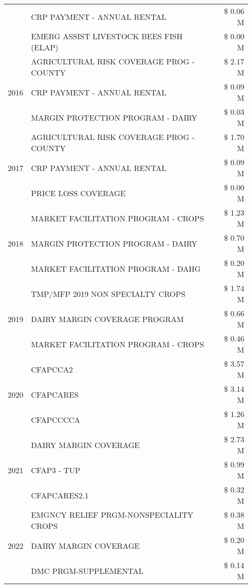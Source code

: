 \begin{tabular}{llr}
 & CRP PAYMENT - ANNUAL RENTAL & \$ 0.06 M \\
 & EMERG ASSIST LIVESTOCK BEES FISH (ELAP) & \$ 0.00 M \\
\cline{1-3}
\multirow[t]{3}{*}{2016} & AGRICULTURAL RISK COVERAGE PROG - COUNTY & \$ 2.17 M \\
 & CRP PAYMENT - ANNUAL RENTAL & \$ 0.09 M \\
 & MARGIN PROTECTION PROGRAM - DAIRY & \$ 0.03 M \\
\cline{1-3}
\multirow[t]{3}{*}{2017} & AGRICULTURAL RISK COVERAGE PROG - COUNTY & \$ 1.70 M \\
 & CRP PAYMENT - ANNUAL RENTAL & \$ 0.09 M \\
 & PRICE LOSS COVERAGE & \$ 0.00 M \\
\cline{1-3}
\multirow[t]{3}{*}{2018} & MARKET FACILITATION PROGRAM - CROPS & \$ 1.23 M \\
 & MARGIN PROTECTION PROGRAM - DAIRY & \$ 0.70 M \\
 & MARKET FACILITATION PROGRAM - DAHG & \$ 0.20 M \\
\cline{1-3}
\multirow[t]{3}{*}{2019} & TMP/MFP 2019 NON SPECIALTY CROPS & \$ 1.74 M \\
 & DAIRY MARGIN COVERAGE PROGRAM & \$ 0.66 M \\
 & MARKET FACILITATION PROGRAM - CROPS & \$ 0.46 M \\
\cline{1-3}
\multirow[t]{3}{*}{2020} & CFAPCCA2 & \$ 3.57 M \\
 & CFAPCARES & \$ 3.14 M \\
 & CFAPCCCCA & \$ 1.26 M \\
\cline{1-3}
\multirow[t]{3}{*}{2021} & DAIRY MARGIN COVERAGE & \$ 2.73 M \\
 & CFAP3 - TUP & \$ 0.99 M \\
 & CFAPCARES2.1 & \$ 0.32 M \\
\cline{1-3}
\multirow[t]{3}{*}{2022} & EMGNCY RELIEF PRGM-NONSPECIALITY CROPS & \$ 0.38 M \\
 & DAIRY MARGIN COVERAGE & \$ 0.20 M \\
 & DMC PRGM-SUPPLEMENTAL & \$ 0.14 M \\
\cline{1-3}
\bottomrule
\end{tabular}
